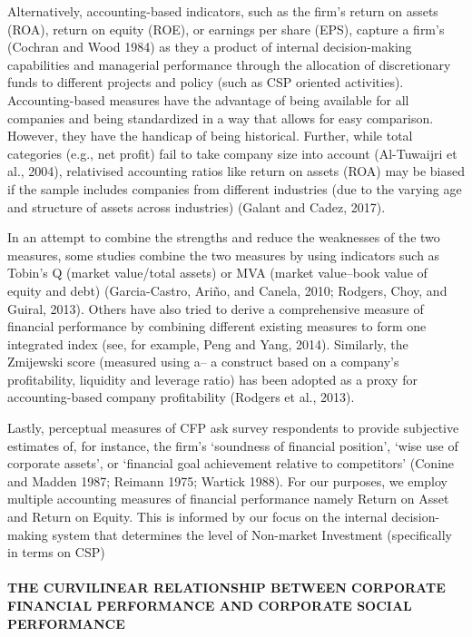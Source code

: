 \documentclass[
]{mitthesis}
\begin{document}
Alternatively, accounting-based indicators, such as the firm's return on assets (ROA), return on equity (ROE), or earnings per share (EPS), capture a firm's (Cochran and Wood 1984) as they a product of internal decision-making capabilities and managerial performance through the allocation of discretionary funds to different projects and policy (such as CSP oriented activities). Accounting-based measures have the advantage of being available for all companies and being standardized in a way that allows for easy comparison. However, they have the handicap of being historical. Further, while total categories (e.g., net profit) fail to take company size into account (Al-Tuwaijri et al., 2004), relativised accounting ratios like return on assets (ROA) may be biased if the sample includes companies from different industries (due to the varying age and structure of assets across industries) (Galant and Cadez, 2017).

In an attempt to combine the strengths and reduce the weaknesses of the two measures, some studies combine the two measures by using indicators such as Tobin's Q (market value/total assets) or MVA (market value--book value of equity and debt) (Garcia-Castro, Ariño, and Canela, 2010; Rodgers, Choy, and Guiral, 2013). Others have also tried to derive a comprehensive measure of financial performance by combining different existing measures to form one integrated index (see, for example, Peng and Yang, 2014). Similarly, the Zmijewski score (measured using a-- a construct based on a company's profitability, liquidity and leverage ratio) has been adopted as a proxy for accounting-based company profitability (Rodgers et al., 2013).

Lastly, perceptual measures of CFP ask survey respondents to provide subjective estimates of, for instance, the firm's `soundness of financial position', `wise use of corporate assets', or `financial goal achievement relative to competitors' (Conine and Madden 1987; Reimann 1975; Wartick 1988). For our purposes, we employ multiple accounting measures of financial performance namely Return on Asset and Return on Equity. This is informed by our focus on the internal decision-making system that determines the level of Non-market Investment (specifically in terms on CSP)

\hypertarget{the-curvilinear-relationship-between-corporate-financial-performance-and-corporate-social-performance}{%
\paragraph{THE CURVILINEAR RELATIONSHIP BETWEEN CORPORATE FINANCIAL PERFORMANCE AND CORPORATE SOCIAL PERFORMANCE}\label{the-curvilinear-relationship-between-corporate-financial-performance-and-corporate-social-performance}}
\end{document}

